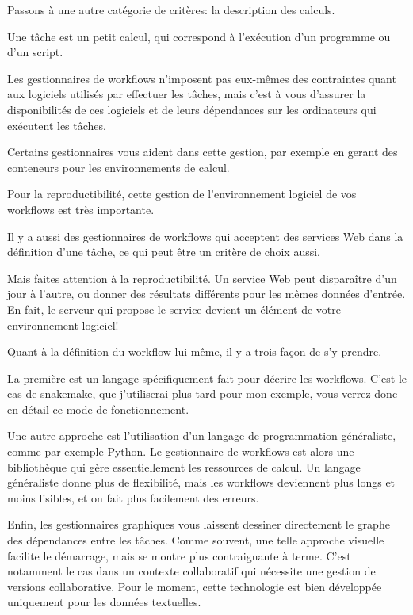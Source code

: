 \documentclass[12pt]{article}
\begin{document}
\newpage

Passons à une autre catégorie de critères: la description des calculs.

Une tâche est un petit calcul, qui correspond à l'exécution d'un
programme ou d'un script.

Les gestionnaires de workflows n'imposent pas eux-mêmes des
contraintes quant aux logiciels utilisés par effectuer les tâches,
mais c'est à vous d'assurer la disponibilités de ces logiciels et de
leurs dépendances sur les ordinateurs qui exécutent les tâches.

Certains gestionnaires vous aident dans cette gestion, par exemple en
gerant des conteneurs pour les environnements de calcul.

Pour la reproductibilité, cette gestion de l'environnement logiciel
de vos workflows est très importante.

Il y a aussi des gestionnaires de workflows qui acceptent des services
Web dans la définition d'une tâche, ce qui peut être un critère de
choix aussi.

Mais faites attention à la reproductibilité. Un service Web peut
disparaître d'un jour à l'autre, ou donner des résultats différents
pour les mêmes données d'entrée. En fait, le serveur qui propose le
service devient un élément de votre environnement logiciel!

\newpage

Quant à la définition du workflow lui-même, il y a trois façon de s'y
prendre.

La première est un langage spécifiquement fait pour décrire les workflows.
C'est le cas de snakemake, que j'utiliserai plus tard pour mon exemple,
vous verrez donc en détail ce mode de fonctionnement.

Une autre approche est l'utilisation d'un langage de programmation
généraliste, comme par exemple Python. Le gestionnaire de workflows
est alors une bibliothèque qui gère essentiellement les ressources de
calcul. Un langage généraliste donne plus de flexibilité, mais les
workflows deviennent plus longs et moins lisibles, et on fait plus
facilement des erreurs.

Enfin, les gestionnaires graphiques vous laissent dessiner directement
le graphe des dépendances entre les tâches. Comme souvent, une telle
approche visuelle facilite le démarrage, mais se montre plus
contraignante à terme. C'est notamment le cas dans un contexte collaboratif
qui nécessite une gestion de versions collaborative. Pour le moment,
cette technologie est bien développée uniquement pour les données
textuelles.
\end{document}
